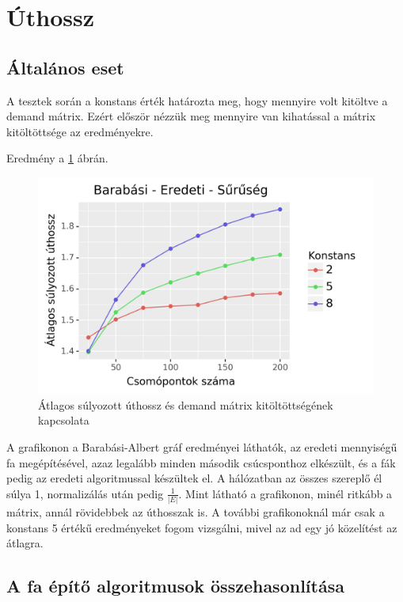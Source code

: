 \documentclass[12pt]{report}
\begin{document}
\section{Úthossz}

\subsection{Általános eset}

A tesztek során a konstans érték határozta meg, hogy mennyire volt kitöltve a demand mátrix.
Ezért először nézzük meg mennyire van kihatással a mátrix kitöltöttsége az eredményekre.

Eredmény a \ref{density-len} ábrán.

\begin{figure}[H]
	\begin{center}
		\includegraphics[width=0.9\linewidth]{pictures/density_len.png}
		\caption{Átlagos súlyozott úthossz és demand mátrix kitöltöttségének kapcsolata}
		\label{density-len}
	\end{center}
\end{figure}

A grafikonon a Barabási-Albert gráf eredményei láthatók, az eredeti mennyiségű fa megépítésével, azaz legalább minden második csúcsponthoz elkészült, és a fák pedig az eredeti algoritmussal készültek el.
A hálózatban az összes szereplő él súlya 1, normalizálás után pedig
\(\frac{1}{|E|}\).
Mint látható a grafikonon, minél ritkább a mátrix, annál rövidebbek az úthosszak is.
A további grafikonoknál már csak a konstans 5 értékű eredményeket fogom vizsgálni, mivel az ad egy jó közelítést az átlagra.

\subsection{A fa építő algoritmusok összehasonlítása}
\end{document}
